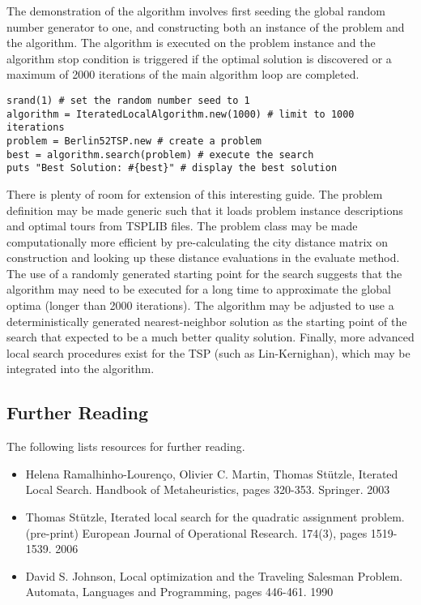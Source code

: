 The demonstration of the algorithm involves first seeding the global random number generator to one, and constructing both an instance of the problem and the algorithm. The algorithm is executed on the problem instance and the algorithm stop condition is triggered if the optimal solution is discovered or a maximum of 2000 iterations of the main algorithm loop are completed.

\begin{lstlisting}
srand(1) # set the random number seed to 1
algorithm = IteratedLocalAlgorithm.new(1000) # limit to 1000 iterations 
problem = Berlin52TSP.new # create a problem
best = algorithm.search(problem) # execute the search
puts "Best Solution: #{best}" # display the best solution
\end{lstlisting}

There is plenty of room for extension of this interesting guide. The problem definition may be made generic such that it loads problem instance descriptions and optimal tours from TSPLIB files. The problem class may be made computationally more efficient by pre-calculating the city distance matrix on construction and looking up these distance evaluations in the evaluate method. The use of a randomly generated starting point for the search suggests that the algorithm may need to be executed for a long time to approximate the global optima (longer than 2000 iterations). The algorithm may be adjusted to use a deterministically generated nearest-neighbor solution as the starting point of the search that expected to be a much better quality solution. Finally, more advanced local search procedures exist for the TSP (such as Lin-Kernighan), which may be integrated into the algorithm.

\subsection{Further Reading}
The following lists resources for further reading.

\begin{itemize}
	\item Helena Ramalhinho-Lourenço, Olivier C. Martin, Thomas Stützle, Iterated Local Search. Handbook of Metaheuristics, pages 320-353. Springer. 2003
    \item Thomas Stützle, Iterated local search for the quadratic assignment problem. (pre-print) European Journal of Operational Research. 174(3), pages 1519-1539. 2006
    \item David S. Johnson, Local optimization and the Traveling Salesman Problem. Automata, Languages and Programming, pages 446-461. 1990
\end{itemize}
